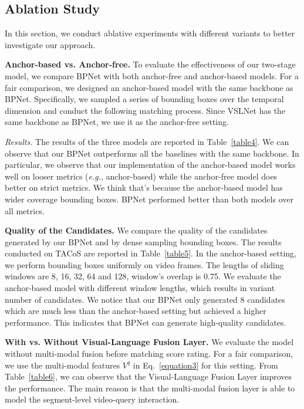 \documentclass[letterpaper]{article} %
\newcommand{\eg}{\emph{e.g.}}
\begin{document}
\subsection{Ablation Study}
\label{ablation}
In this section, we conduct ablative experiments with different 
variants to better investigate our approach. 

\noindent\textbf{Anchor-based vs. Anchor-free.}
To evaluate the effectiveness of our two-stage model, 
we compare BPNet with both anchor-free and anchor-based models. 
For a fair comparison, we designed an anchor-based model with the 
same backbone as BPNet. Specifically, we sampled a series of 
bounding boxes over the temporal dimension and conduct the following 
matching process. Since VSLNet has the same backbone as 
BPNet, we use it as the anchor-free setting.

\noindent\emph{Results.}
The results of the three models are reported in Table~\ref{table4}. 
We can observe that our BPNet outperforms all the baselines with 
the same backbone. 
In particular, we observe that our implementation of the anchor-based 
model works well on looser metrics (\eg, anchor-based)
while the anchor-free model does 
better on strict metrics. We think that's because the anchor-based model has wider coverage bounding boxes. 
BPNet performed better than both models over all metrics.

\noindent\textbf{Quality of the Candidates.}
We compare the quality of the candidates generated by our BPNet and 
by dense sampling bounding boxes. 
The results conducted on TACoS are reported in Table~\ref{table5}. 
In the anchor-based setting, we perform bounding boxes uniformly on video frames. 
The lengths of sliding windows are 8, 16, 32, 64 and 128, window's overlap is 0.75. We evaluate the anchor-based model with different window lengths, which results 
in variant number of candidates. 
We notice that our BPNet only generated 8 candidates which are much less than the 
anchor-based setting but achieved a higher performance. 
This indicates that BPNet can generate high-quality candidates. 

\noindent\textbf{With vs. Without Visual-Language Fusion Layer.}
We evaluate the model without multi-modal fusion before matching score rating. 
For a fair comparison, we use the multi-modal features $V^{q}$ in Eq.~\eqref{equation3} for 
this setting. 
From Table~\ref{table6}, we can observe that the Visual-Language Fusion Layer 
improves the performance.  
The main reason is that the multi-modal fusion layer is able to 
model the segment-level video-query interaction.
\end{document}
